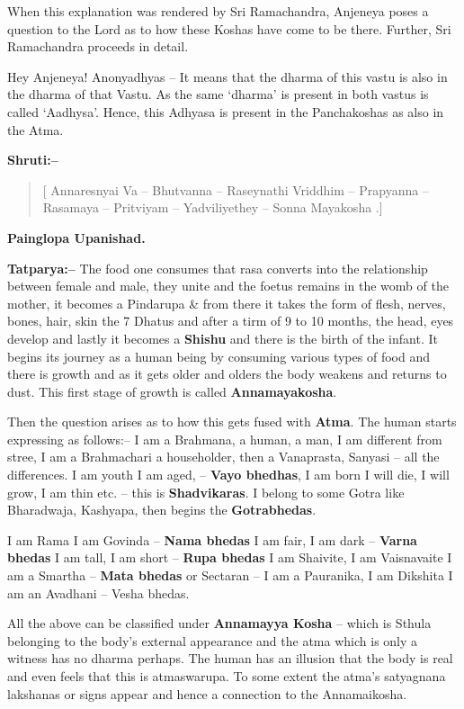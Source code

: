 When this explanation was rendered by Sri Ramachandra, Anjeneya poses a question to the Lord as to how these Koshas have come to be there. Further, Sri Ramachandra proceeds in detail.

Hey Anjeneya! Anonyadhyas – It means that the dharma of this vastu is also in the dharma of that Vastu. As the same ‘dharma’ is present in both vastus is called ‘Aadhysa’. Hence, this Adhyasa is present in the Panchakoshas as also in the Atma.

\textbf{Shruti:–}

\begin{verse}
[ Annaresnyai Va – Bhutvanna – Raseynathi Vriddhim – Prapyanna – Rasamaya – Pritviyam – Yadviliyethey – Sonna Mayakosha .]
\end{verse}

\begin{flushright}
\textbf{Painglopa Upanishad.}
\end{flushright}

\textbf{Tatparya:–} The food one consumes that rasa converts into the relationship between female and male, they unite and the foetus remains in the womb of the mother, it becomes a Pindarupa \& from there it takes the form of flesh, nerves, bones, hair, skin the 7 Dhatus and after a tirm of 9 to 10 months, the head, eyes develop and lastly it becomes a \textbf{Shishu} and there is the birth of the infant. It begins its journey as a human being by consuming various types of food and there is growth and as it gets older and olders the body weakens and returns to dust. This first stage of growth is called \textbf{Annamayakosha}.

Then the question arises as to how this gets fused with \textbf{Atma}. The human starts expressing as follows:– I am a Brahmana, a human, a man, I am different from stree, I am a Brahmachari a householder, then a Vanaprasta, Sanyasi – all the differences. I am youth I am aged, – \textbf{Vayo bhedhas}, I am born I will die, I will grow, I am thin etc. – this is \textbf{Shadvikaras}. I belong to some Gotra like Bharadwaja, Kashyapa, then begins the \textbf{Gotrabhedas}.

I am Rama I am Govinda – \textbf{Nama bhedas} I am fair, I am dark – \textbf{Varna bhedas} I am tall, I am short – \textbf{Rupa bhedas} I am Shaivite, I am Vaisnavaite I am a Smartha – \textbf{Mata bhedas} or Sectaran – I am a Pauranika, I am Dikshita I am an Avadhani – Vesha bhedas.

All the above can be classified under \textbf{Annamayya Kosha} – which is Sthula belonging to the body's external appearance and the atma which is only a witness has no dharma perhaps. The human has an illusion that the body is real and even feels that this is atmaswarupa. To some extent the atma's satyagnana lakshanas or signs appear and hence a connection to the Annamaikosha.

